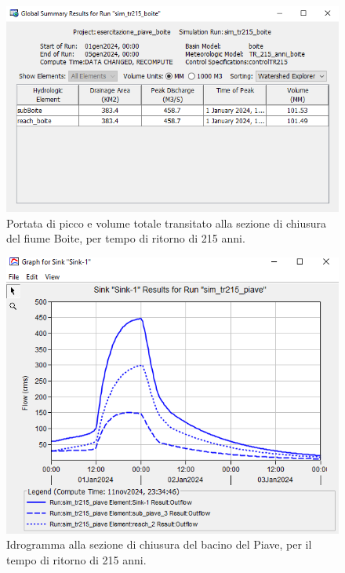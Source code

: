 \begin{figure}[htb] \centering
\includegraphics[scale=0.6]{immagini/risul_boite_215.PNG}
\caption{Portata di picco e volume totale transitato alla sezione di chiusura del fiume Boite, per tempo di ritorno di 215 anni.}
\label{figure:risul_boite_215}
\end{figure}

\begin{figure}[htb] \centering
\includegraphics[scale=0.6]{immagini/sink_piave_215.PNG}
\caption{Idrogramma alla sezione di chiusura del bacino del Piave, per il tempo di ritorno di 215 anni.}
\label{figure:sink_piave_215}    
\end{figure}

